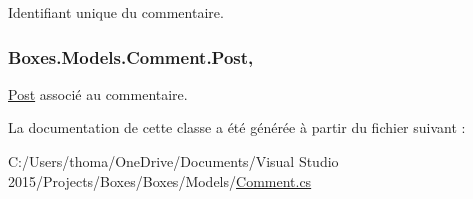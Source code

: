 Identifiant unique du commentaire. 

\subsubsection[{\texorpdfstring{Post}{Post}}]{ Boxes.\+Models.\+Comment.\+Post\hspace{0.3cm}{\ttfamily [get]}, {\ttfamily [set]}}\hypertarget{class_boxes_1_1_models_1_1_comment_ae5726689c13aba3c4b37b53d7892a268}{}\label{class_boxes_1_1_models_1_1_comment_ae5726689c13aba3c4b37b53d7892a268}


\hyperlink{class_boxes_1_1_models_1_1_post}{Post} associé au commentaire. 



La documentation de cette classe a été générée à partir du fichier suivant \+:\begin{DoxyCompactItemize}
\item 
C\+:/\+Users/thoma/\+One\+Drive/\+Documents/\+Visual Studio 2015/\+Projects/\+Boxes/\+Boxes/\+Models/\hyperlink{_comment_8cs}{Comment.\+cs}\end{DoxyCompactItemize}
